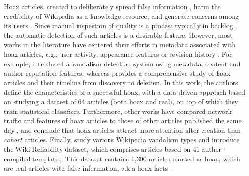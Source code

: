 Hoax articles, created to deliberately spread false information \cite{kumar2016disinformation}, harm the credibility of Wikipedia as a knowledge resource, and generate concerns among its users \cite{hu2007measuring}. Since manual inspection of quality is a process typically in backlog \cite{dang2016quality}, the automatic detection of such articles is a desirable feature. However, most works in the literature have centered their efforts in metadata associated with hoax articles, e.g., user activity, appearance features or revision history \cite{zeng2006trust,elebiary2023role, kumar2016disinformation,wong2021wikireliability,hu2007measuring, susuri2017detection}. For example, \citet{adler2011wikipedia} introduced a vandalism detection system using metadata, content and author reputation features, whereas \citet{kumar2016disinformation} provides a comprehensive study of hoax articles and their timeline from discovery to deletion. In this work, the authors define the characteristics of a successful hoax, with a data-driven approach based on studying a dataset of 64 articles (both hoax and real), on top of which they train statistical classifiers. Furthermore, other works have compared network traffic and features of hoax articles to those of other articles published the same day \citep{elebiary2023role}, and conclude that hoax articles attract more attention after creation than \textit{cohort} articles. Finally, \citet{wong2021wikireliability} study various Wikipedia vandalism types and introduce the Wiki-Reliability dataset, which comprises articles based on 41 author-compiled templates. This dataset contains 1,300 articles marked as hoax, which are real articles with false information, a.k.a hoax facts \citep{kumar2016disinformation}.


